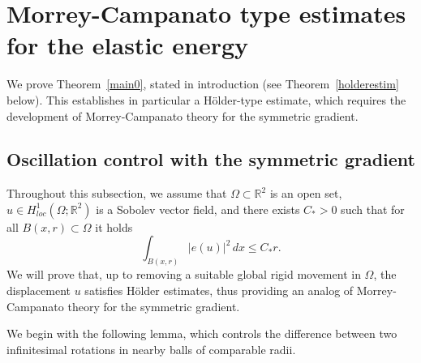 \documentclass[12pt]{article}
\theoremstyle{definition}
\theoremstyle{remark}
\numberwithin{equation}{section}
\newcommand{\R}{\mathbb{R}}
\begin{document}
\section{Morrey-Campanato type estimates for the elastic energy}
\label{section5}

We prove Theorem~\ref{main0}, stated in introduction (see Theorem~\ref{holderestim} below). This establishes in
particular a Hölder-type estimate, which requires the development of Morrey-Campanato theory for the symmetric
gradient.


\subsection{Oscillation control with the symmetric gradient}
\label{SubsectionOscillation}
\newcommand{\Ce}{C_*}

Throughout this subsection, we assume that $\Omega \subset \R^2$ is an open set, $u \in H^1_{loc}(\Omega;\R^2)$ is a
Sobolev vector field, and there exists $\Ce>0$ such that for all $B(x,r)\subset \Omega$ it holds 
\begin{equation}
    \label{eqeq17}
    \int_{B(x,r)} |e(u)|^2 \, dx \leq \Ce r.
\end{equation}
We will prove that, up to removing a suitable global rigid movement in $\Omega$, the displacement $u$ satisfies
Hölder estimates, thus providing an analog of Morrey-Campanato theory for the symmetric gradient.

We begin with the following lemma, which controls the difference between two infinitesimal rotations in nearby balls of
comparable radii.

\end{document}
